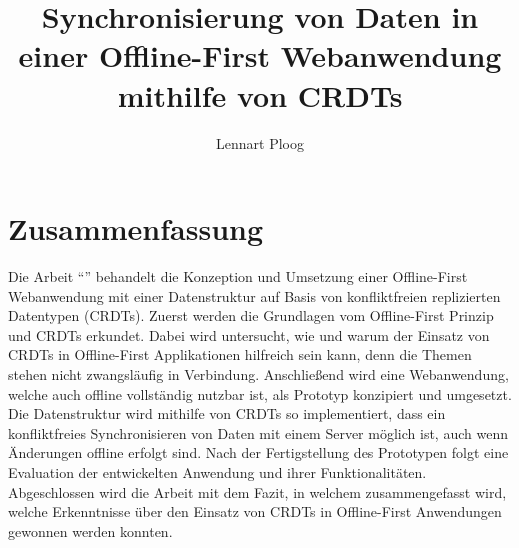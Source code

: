 \documentclass[a4paper, 12pt]{scrreprt}
\title{Synchronisierung von Daten in einer Offline-First Webanwendung mithilfe von CRDTs}
\subtitle{}
\author{Lennart Ploog}
\makeatletter
\let\inserttitle\@title
\makeatother
\begin{document}
\newpage
\section*{Zusammenfassung}
Die Arbeit \enquote{\inserttitle} behandelt die Konzeption und Umsetzung einer Offline-First Webanwendung mit einer Datenstruktur auf Basis von konfliktfreien replizierten Datentypen (CRDTs). Zuerst werden die Grundlagen vom Offline-First Prinzip und CRDTs erkundet. Dabei wird untersucht, wie und warum der Einsatz von CRDTs in Offline-First Applikationen hilfreich sein kann, denn die Themen stehen nicht zwangsläufig in Verbindung. Anschließend wird eine Webanwendung, welche auch offline vollständig nutzbar ist, als Prototyp konzipiert und umgesetzt. Die Datenstruktur wird mithilfe von CRDTs so implementiert, dass ein konfliktfreies Synchronisieren von Daten mit einem Server möglich ist, auch wenn Änderungen offline erfolgt sind. Nach der Fertigstellung des Prototypen folgt eine Evaluation der entwickelten Anwendung und ihrer Funktionalitäten. Abgeschlossen wird die Arbeit mit dem Fazit, in welchem zusammengefasst wird, welche Erkenntnisse über den Einsatz von CRDTs in Offline-First Anwendungen gewonnen werden konnten.
\end{document}
